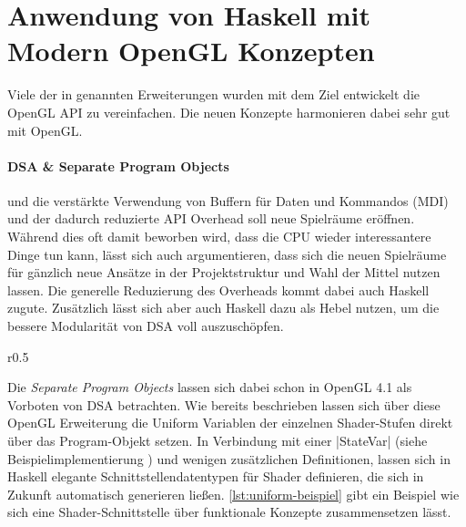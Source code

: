 \section{Anwendung von Haskell mit Modern OpenGL Konzepten}

Viele der in  genannten Erweiterungen wurden mit dem Ziel entwickelt die OpenGL API zu vereinfachen. Die neuen Konzepte harmonieren dabei sehr gut mit OpenGL.

\paragraph{\acl{DSA} \& Separate Program Objects} und die verstärkte Verwendung von Buffern für Daten und Kommandos (\ac{MDI}) und der dadurch reduzierte API Overhead soll neue Spielräume eröffnen. Während dies oft damit beworben wird, dass die CPU wieder interessantere Dinge tun kann, lässt sich auch argumentieren, dass sich die neuen Spielräume für gänzlich neue Ansätze in der Projektstruktur und Wahl der Mittel nutzen lassen. Die generelle Reduzierung des Overheads kommt dabei auch Haskell zugute. Zusätzlich lässt sich aber auch Haskell dazu als Hebel nutzen, um die bessere Modularität von \ac{DSA} voll auszuschöpfen.

\begin{wrapfigure}{r}{0.5\linewidth}
\centering
{}
\end{wrapfigure}

Die \textit{Separate Program Objects} lassen sich dabei schon in OpenGL 4.1 als Vorboten von \ac{DSA} betrachten. Wie bereits beschrieben lassen sich über diese OpenGL Erweiterung die Uniform Variablen der einzelnen Shader-Stufen direkt über das Program-Objekt setzen. In Verbindung mit einer |StateVar| (siehe Beispielimplementierung ) und wenigen zusätzlichen Definitionen, lassen sich in Haskell elegante Schnittstellendatentypen für Shader definieren, die sich in Zukunft automatisch generieren ließen. \ref{lst:uniform-beispiel} gibt ein Beispiel wie sich eine Shader-Schnittstelle über funktionale Konzepte zusammensetzen lässt.

\endgroup
